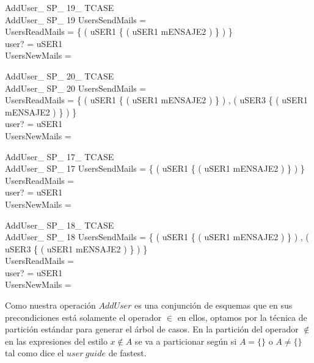 \begin{schema}{AddUser\_ SP\_ 19\_ TCASE}\\
 AddUser\_ SP\_ 19
\where
 UsersSendMails =~\emptyset \\
 UsersReadMails = \{ ( uSER1 \mapsto \{ ( uSER1 \mapsto mENSAJE2 ) \} ) \} \\
 user? = uSER1 \\
 UsersNewMails =~\emptyset
\end{schema}

{\footnotesize
\begin{schema}{AddUser\_ SP\_ 20\_ TCASE}\\
 AddUser\_ SP\_ 20
\where
 UsersSendMails =~\emptyset \\
 UsersReadMails = \{ ( uSER1 \mapsto \{ ( uSER1 \mapsto mENSAJE2 ) \} ) , ( uSER3 \mapsto \{ ( uSER1 \mapsto mENSAJE2 ) \} ) \} \\
 user? = uSER1 \\
 UsersNewMails =~\emptyset
\end{schema}
}

\begin{schema}{AddUser\_ SP\_ 17\_ TCASE}\\
 AddUser\_ SP\_ 17
\where
 UsersSendMails = \{ ( uSER1 \mapsto \{ ( uSER1 \mapsto mENSAJE2 ) \} ) \} \\
 UsersReadMails =~\emptyset \\
 user? = uSER1 \\
 UsersNewMails =~\emptyset
\end{schema}

{\footnotesize
\begin{schema}{AddUser\_ SP\_ 18\_ TCASE}\\
 AddUser\_ SP\_ 18
\where
 UsersSendMails = \{ ( uSER1 \mapsto \{ ( uSER1 \mapsto mENSAJE2 ) \} ) , ( uSER3 \mapsto \{ ( uSER1 \mapsto mENSAJE2 ) \} ) \} \\
 UsersReadMails =~\emptyset \\
 user? = uSER1 \\
 UsersNewMails =~\emptyset
\end{schema}
}

Como nuestra operación $AddUser$ es una conjunción de esquemas que en sus precondiciones está solamente el operador $\in$ en ellos, optamos por la técnica de partición estándar para generar el árbol de casos. En la partición del operador $\notin$ en las expresiones del estilo $x \notin A$ se va a particionar según si $A = \{\}$ o $A \neq \{\}$ tal como dice el $user \  guide$ de fastest. 


